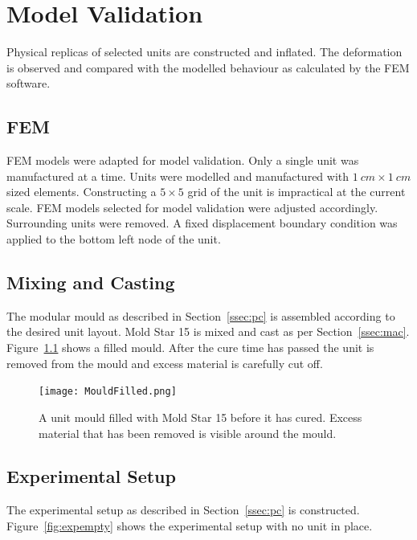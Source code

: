 \chapter{Model Validation}
\label{chp:MV}


Physical replicas of selected units are constructed and inflated. The deformation is observed and compared with the modelled behaviour as calculated by the FEM software.

\section{FEM}

FEM models were adapted for model validation. Only a single unit was manufactured at a time. Units were modelled and manufactured with $\SI{1}{cm}\times \SI{1}{cm}$ sized elements. Constructing a $5\times 5$ grid of the unit is impractical at the current scale. FEM models selected for model validation were adjusted accordingly. Surrounding units were removed. A fixed displacement boundary condition was applied to the bottom left node of the unit.

\section{Mixing and Casting}

The modular mould as described in Section~\ref{ssec:pc} is assembled according to the desired unit layout. Mold Star 15 is mixed and cast as per Section~\ref{ssec:mac}. Figure~\ref{fig:fillmould} shows a filled mould. After the cure time has passed the unit is removed from the mould and excess material is carefully cut off. 

\begin{figure}[H]
	\centering
	\texttt{[image: MouldFilled.png]}
	\caption[A filled unit mould]{A unit mould filled with Mold Star 15 before it has cured. Excess material that has been removed is visible around the mould.}
	\label{fig:fillmould}
\end{figure}

\section{Experimental Setup}

The experimental setup as described in Section~\ref{ssec:pc} is constructed. Figure~\ref{fig:expempty} shows the experimental setup with no unit in place.


